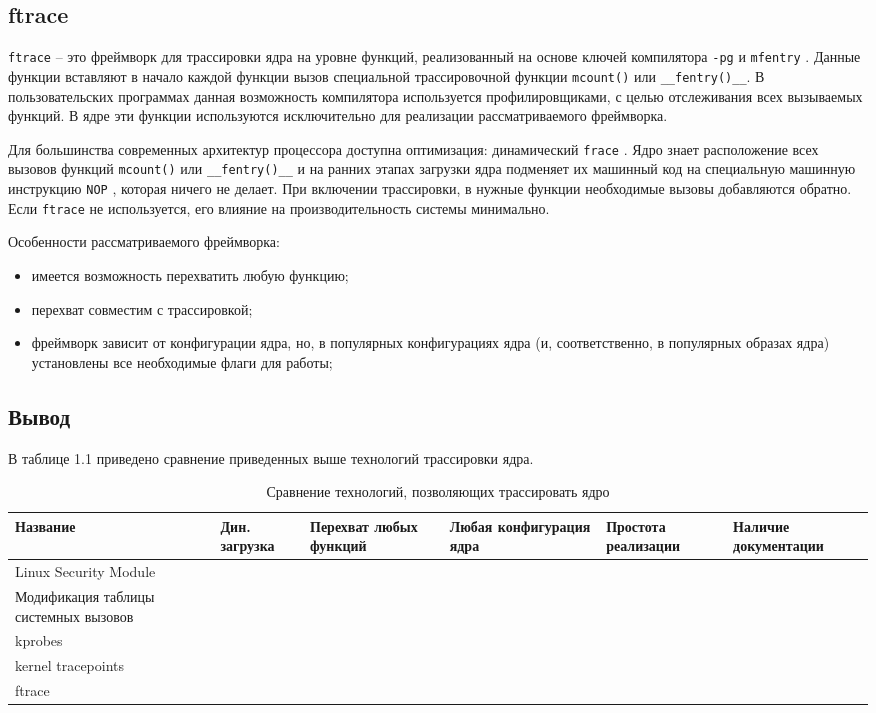 \subsection{ftrace}

\texttt{ftrace} \cite{ftrace} -- это фреймворк для трассировки ядра на уровне функций, реализованный на основе ключей компилятора \texttt{-pg} \cite{ftrace-habr} и \texttt{mfentry} \cite{ftrace-habr}. Данные функции вставляют в начало каждой функции вызов специальной трассировочной функции \texttt{mcount()} или \texttt{\_\_fentry()\_\_}. В пользовательских программах данная возможность компилятора используется профилировщиками, с целью отслеживания всех вызываемых функций. В ядре эти функции используются исключительно для реализации рассматриваемого фреймворка.

Для большинства современных архитектур процессора доступна оптимизация: динамический \texttt{frace} \cite{ftrace-habr}. Ядро знает расположение всех вызовов функций \texttt{mcount()} или \texttt{\_\_fentry()\_\_} и на ранних этапах загрузки ядра подменяет их машинный код на специальную машинную инструкцию \texttt{NOP} \cite{NOP}, которая ничего не делает. При включении трассировки, в нужные функции необходимые вызовы добавляются обратно. Если \texttt{ftrace} не используется, его влияние на производительность системы минимально.

Особенности рассматриваемого фреймворка:

\begin{itemize}
	\item имеется возможность перехватить любую функцию;
	\item перехват совместим с трассировкой;
	\item фреймворк зависит от конфигурации ядра, но, в популярных конфигурациях ядра (и, соответственно, в популярных образах ядра) установлены все необходимые флаги для работы; 
\end{itemize}

\subsection*{Вывод}

В таблице 1.1 приведено сравнение приведенных выше технологий трассировки ядра. 

\begin{table}[h]
	\centering
	\label{tab:analyze}
	\begin{tabular}{ | p{3cm} | p{2cm} | p{2cm} | p{2cm} | p{2cm} | p{2cm} | }
		\hline
		Название & Дин. загрузка & Перехват любых функций & Любая конфигурация ядра & Простота реализации & Наличие документации \\
		\hline
		Linux Security Module & & & & & \\
		\hline
		Модификация таблицы системных вызовов & & & & & \\
		\hline
		kprobes & & & & & \\
		\hline
		kernel tracepoints & & & & &  \\
		\hline
		ftrace & & & & & \\
		\hline
	\end{tabular}
	\caption{Сравнение технологий, позволяющих трассировать ядро}
\end{table}

